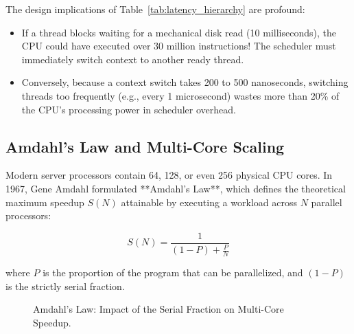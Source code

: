 The design implications of Table~\ref{tab:latency_hierarchy} are profound:
\begin{itemize}
    \item If a thread blocks waiting for a mechanical disk read (10 milliseconds), the CPU could have executed over 30 million instructions! The scheduler must immediately switch context to another ready thread.
    \item Conversely, because a context switch takes 200 to 500 nanoseconds, switching threads too frequently (e.g., every 1 microsecond) wastes more than 20\% of the CPU's processing power in scheduler overhead.
\end{itemize}

\subsection{Amdahl's Law and Multi-Core Scaling}
Modern server processors contain 64, 128, or even 256 physical CPU cores. In 1967, Gene Amdahl formulated **Amdahl's Law**, which defines the theoretical maximum speedup $S(N)$ attainable by executing a workload across $N$ parallel processors:

\begin{equation}
S(N) = \frac{1}{(1 - P) + \frac{P}{N}}
\end{equation}

where $P$ is the proportion of the program that can be parallelized, and $(1 - P)$ is the strictly serial fraction.

\begin{figure}[htbp]
\centering
{}
\caption{Amdahl's Law: Impact of the Serial Fraction on Multi-Core Speedup.}
\label{fig:amdahls_law}
\end{figure}

